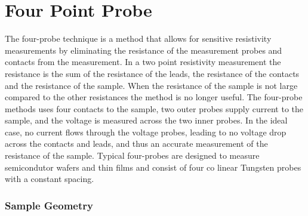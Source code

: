 
\chapter{Four Point Probe}
    The four-probe technique is a method that allows for sensitive resistivity measurements by eliminating the resistance of the measurement probes and contacts from the measurement. In a two point resistivity measurement the resistance is the sum of the resistance of the leads, the resistance of the contacts and the resistance of the sample. When the resistance of the sample is not large compared to the other resistances the method is no longer useful. The four-probe methods uses four contacts to the sample, two outer probes supply current to the sample, and the voltage is measured across the two inner probes. In the ideal case, no current flows through the voltage probes, leading to no voltage drop across the contacts and leads, and thus an accurate measurement of the resistance of the sample. Typical four-probes are designed to measure semicondutor wafers and thin films and consist of four co linear Tungsten probes with a constant spacing. 
    
 \subsection{Sample Geometry}
    
\cleardoublepage